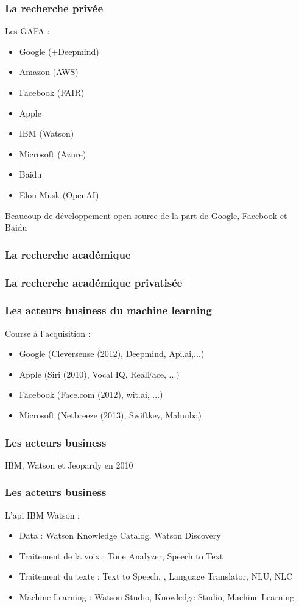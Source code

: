 \begin{frame}
  \frametitle{La recherche privée}
  Les GAFA :
  \begin{itemize}
  \item Google (+Deepmind)
  \item Amazon (AWS)
  \item Facebook (FAIR)
  \item Apple 
  \item IBM (Watson)
  \item Microsoft (Azure)
  \item Baidu
  \item Elon Musk (OpenAI)
  \end{itemize}
  Beaucoup de développement open-source de la part de Google, Facebook et Baidu
\end{frame}

\begin{frame}
  \frametitle{La recherche académique}
\end{frame}

\begin{frame}
  \frametitle{La recherche académique privatisée}
\end{frame}

\begin{frame}
  \frametitle{Les acteurs business du machine learning}
  Course à l'acquisition :
  \begin{itemize}
    \item Google (Cleversense (2012), Deepmind, Api.ai,...)
    \item Apple (Siri (2010), Vocal IQ, RealFace, ...) 
    \item Facebook (Face.com (2012), wit.ai, ...)
    \item Microsoft (Netbreeze (2013), Swiftkey, Maluuba)
    \end{itemize}
\end{frame}

\begin{frame}
  \frametitle{Les acteurs business}
  IBM, Watson et Jeopardy en 2010
\end{frame}

\begin{frame}
  \frametitle{Les acteurs business}
  L'api IBM Watson :
  \begin{itemize}
    \item Data : Watson Knowledge Catalog, Watson Discovery
    \item Traitement de la voix : Tone Analyzer, Speech to Text
    \item Traitement du texte : Text to Speech, , Language Translator, NLU, NLC
    \item Machine Learning : Watson Studio, Knowledge Studio, Machine Learning
  \end{itemize}
\end{frame}

